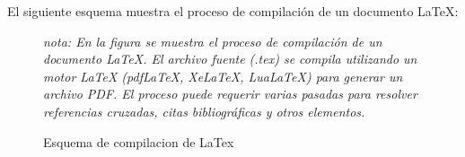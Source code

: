 \documentclass[10pt]{article}
\begin{document}
    El siguiente esquema muestra el proceso de compilación de un documento LaTeX:
    \begin{figure}[ht]
        \centering
        \caption{Esquema de compilacion de LaTex}
        \label{fig:LatexD}
    \textit{nota: En la figura se muestra el proceso de compilación de un documento LaTeX. El archivo fuente (.tex) se compila utilizando un motor LaTeX (pdfLaTeX, XeLaTeX, LuaLaTeX) para generar un archivo PDF. El proceso puede requerir varias pasadas para resolver referencias cruzadas, citas bibliográficas y otros elementos.}
    \end{figure}
    
    
\end{document}
